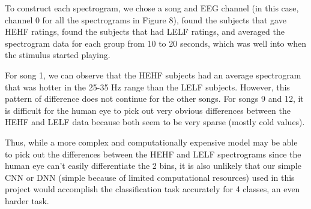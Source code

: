 \documentclass[fleqn,10pt]{SelfArx} %
\begin{document}
To construct each spectrogram, we chose a song and EEG channel (in this case, channel 0 for all the spectrograms in Figure 8), found the subjects that gave HEHF ratings, found the subjects that had LELF ratings, and averaged the spectrogram data for each group from 10 to 20 seconds, which was well into when the stimulus started playing. 

For song 1, we can observe that the HEHF subjects had an average spectrogram that was hotter in the 25-35 Hz range than the LELF subjects. However, this pattern of difference does not continue for the other songs. For songs 9 and 12, it is difficult for the human eye to pick out very obvious differences between the HEHF and LELF data because both seem to be very sparse (mostly cold values).

Thus, while a more complex and computationally expensive model may be able to pick out the differences between the HEHF and LELF spectrograms since the human eye can't easily differentiate the 2 bins, it is also unlikely that our simple CNN or DNN (simple because of limited computational resources) used in this project would accomplish the classification task accurately for 4 classes, an even harder task.
\end{document}
